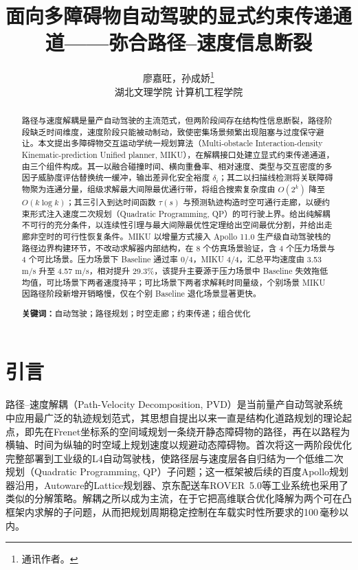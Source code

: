 \documentclass[a4paper,11pt]{ctexart}
\title{面向多障碍物自动驾驶的显式约束传递通道——弥合路径--速度信息断裂}
\author{廖嘉旺，孙成娇\thanks{通讯作者。}\\[2pt]\normalsize 湖北文理学院 计算机工程学院}
\date{}
\theoremstyle{definition}
\begin{document}
\maketitle

\begin{abstract}
\noindent
路径与速度解耦是量产自动驾驶的主流范式，但两阶段间存在结构性信息断裂，路径阶段缺乏时间维度，速度阶段只能被动制动，致使密集场景频繁出现阻塞与过度保守避让。本文提出多障碍物交互运动学统一规划算法（Multi-obstacle Interaction-density Kinematic-prediction Unified planner, MIKU），在解耦接口处建立显式约束传递通道，由三个组件构成。其一以融合碰撞时间、横向重叠率、相对速度、类型与交互密度的多因子威胁度评估替换统一缓冲，输出差异化安全裕度 $\delta_i$；其二以扫描线检测将关联障碍物聚为连通分量，组级求解最大间隙最优通行带，将组合搜索复杂度由 $O(2^k)$ 降至 $O(k\log k)$；其三引入到达时间函数 $\tau(s)$ 与预测轨迹构造时空可通行走廊，以硬约束形式注入速度二次规划（Quadratic Programming, QP）的可行驶上界。给出纯解耦不可行的充分条件，以连续性引理与最大间隙最优性定理给出空间最优分割，并给出走廊非空时的可行性恢复条件。MIKU 以增量方式接入 Apollo 11.0 生产级自动驾驶栈的路径边界构建环节，不改动求解器内部结构，在 8 个仿真场景验证，含 4 个压力场景与 4 个可比场景。压力场景下 Baseline 通过率 0/4，MIKU 4/4，汇总平均速度由 3.53 m/s 升至 4.57 m/s，相对提升 29.3\%，该提升主要源于压力场景中 Baseline 失效拖低均值，可比场景下两者速度持平；可比场景下两者求解耗时同量级，个别场景 MIKU 因路径阶段新增开销略慢，仅在个别 Baseline 退化场景显著更快。

\vspace{0.5em}
\noindent\textbf{关键词：}自动驾驶；路径规划；时空走廊；约束传递；组合优化
\end{abstract}
\section{引言}
\label{sec:intro}

路径--速度解耦（Path-Velocity Decomposition, PVD）是当前量产自动驾驶系统中应用最广泛的轨迹规划范式，其思想自\citet{kant1986pvd}提出以来一直是结构化道路规划的理论起点，即先在Frenet坐标系的空间域规划一条绕开静态障碍物的路径，再在以路程为横轴、时间为纵轴的时空域上规划速度以规避动态障碍物。\citet{fan2018baidu}首次将这一两阶段优化完整部署到工业级的L4自动驾驶栈，使路径层与速度层各自归结为一个低维二次规划（Quadratic Programming, QP）子问题；这一框架被后续的百度Apollo规划器\citep{apollo2024}沿用，Autoware的Lattice规划器、京东配送车ROVER~5.0\citep{wang2022_jfr}等工业系统也采用了类似的分解策略。解耦之所以成为主流，在于它把高维联合优化降解为两个可在凸框架内求解的子问题，从而把规划周期稳定控制在车载实时性所要求的100\,毫秒以内\citep{fan2018baidu}。
\end{document}
